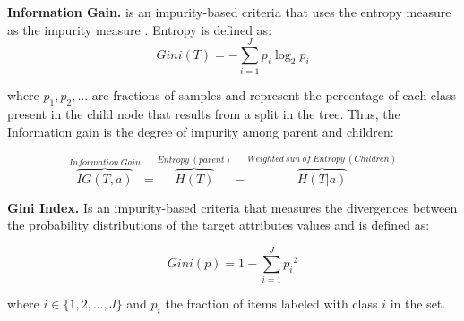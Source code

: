 \textbf{Information Gain.} is an impurity-based criteria that uses the entropy measure as the impurity measure \cite{rokach2008data}. Entropy is defined as:
\begin{equation}
Gini(T)= - \sum_{i=1}^{J}p_{i}\log_{2}p_{i}
\end{equation}

where $p_{1},p_{2},...$ are fractions of samples and represent the percentage of each class present in the child node that results from a split in the tree. Thus, the Information gain is the degree of impurity among  parent and children:

\begin{equation}
\overbrace{IG(T,a)}^{Information \ Gain} = \overbrace{H(T)}^{Entropy \ (parent)} - \overbrace{H(T|a)}^{Weighted \ sun \ of \ Entropy \ (Children)}
\end{equation}

\textbf{Gini Index.} Is an impurity-based criteria that measures the divergences
between the probability distributions of the target attributes \cite{rokach2008data} values and is defined as:

\begin{equation}
Gini(p) = 1 - \sum_{i=1}^{J}{p_{i}}^2
\end{equation}

where  $i \in \{1,2,...,J\}$ and $p_{i}$ the fraction of items labeled with class $i$ in the set.